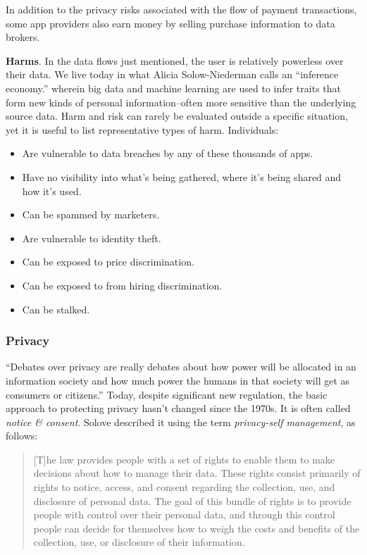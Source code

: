 \documentclass[11pt, oneside]{article}   	%
\begin{document}
In addition to the privacy risks associated with the flow of payment transactions, some app providers also earn money by selling purchase information to data brokers.

\textbf{Harms}. In the data flows just mentioned, the user is relatively powerless over their data. We live today in what Alicia Solow-Niederman calls an ``inference economy.''\cite{Solow-Niederman2022} wherein big data and machine learning are used to infer traits that form new kinds of personal information--often more sensitive than the underlying source data. Harm and risk can rarely be evaluated outside a specific situation\cite{Solove2023}, yet it is useful to list representative types of harm. Individuals:

\begin{itemize}
	\item Are vulnerable to data breaches by any of these thousands of apps.
	\item Have no visibility into what's being gathered, where it's being shared and how it's used.
	\item Can be spammed by marketers.
	\item Are vulnerable to identity theft.
	\item Can be exposed to price discrimination.
	\item Can be exposed to from hiring discrimination.
	\item Can be stalked.
\end{itemize}

\subsubsection{Privacy}

``Debates over privacy are really debates about how power will be allocated in an information society and how much power the humans in that society will get as consumers or citizens.''\cite{Richards2021} Today, despite significant new regulation, the basic approach to protecting privacy hasn't changed since the 1970s. It is often called \emph{notice \& consent}. Solove described it using the term \emph{privacy-self management}, as follows:

\begin{quote}
	[T]he law provides people with a set of rights to enable them to make decisions about how to manage their data. These rights consist primarily of rights to notice, access, and consent regarding the collection, use, and disclosure of personal data. The goal of this bundle of rights is to provide people with control over their  personal data, and through this  control people can decide for themselves how to weigh the costs and benefits of the collection, use, or disclosure of their information.\cite{Solove2012}
\end{quote} 
\end{document}
